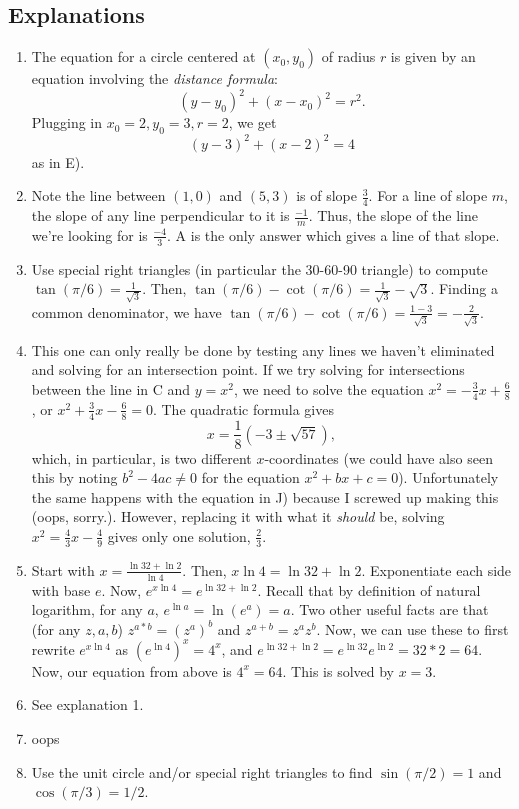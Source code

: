 \documentclass[english]{article}
\theoremstyle{remark}
\theoremstyle{definition}
\begin{document}
	\subsection*{Explanations}
	\begin{enumerate}
	\item The equation for a circle centered at $(x_0,y_0)$ of radius $r$ is given by an equation involving the \emph{distance formula}:$$(y-y_0)^2+(x-x_0)^2=r^2.$$ Plugging in $x_0=2,y_0=3,r=2$, we get $$(y-3)^2+(x-2)^2=4$$ as in E).
	\item Note the line between $(1,0)$ and $(5,3)$ is of slope $\frac{3}{4}$. For a line of slope $m$, the slope of any line perpendicular to it is $\frac{-1}{m}$. Thus, the slope of the line we're looking for is $\frac{-4}{3}$. A is the only answer which gives a line of that slope.
	\item Use special right triangles (in particular the 30-60-90 triangle) to compute $\tan(\pi/6)=\frac{1}{\sqrt{3}}$. Then, $\tan(\pi/6)-\cot(\pi/6)=\frac{1}{\sqrt{3}}-\sqrt{3}$. Finding a common denominator, we have $ \tan(\pi/6)-\cot(\pi/6)=\frac{1-3}{\sqrt{3}}=-\frac{2}{\sqrt{3}}$.\
\item This one can only really be done by testing any lines we haven't eliminated and solving for an intersection point. If we try solving for intersections between the line in C and $y=x^2$, we need to solve the equation $x^2=-\frac{3}{4}x+\frac{6}{8}$, or $x^2+\frac{3}{4}x-\frac{6}{8}=0$. The quadratic formula gives $$x=\frac{1}{8} \left(-3\pm\sqrt{57}\right),$$ which, in particular, is two different $x$-coordinates (we could have also seen this by noting $b^2-4ac\neq 0$ for the equation $x^2+bx+c=0$). Unfortunately the same happens with the equation in J) because I screwed up making this (oops, sorry.). However, replacing it with what it \textit{should} be, solving $x^2=\frac{4}{3}x-\frac{4}{9}$ gives only one solution, $\frac{2}{3}$. 
\item
Start with $x=\frac{\ln32+\ln2}{\ln4}$. Then, $x\ln4=\ln32+\ln2$. Exponentiate each side with base $e$. Now, $e^{x\ln 4}=e^{\ln32+\ln2}$. Recall that by definition of natural logarithm, for any $a$, $e^{\ln a}=\ln(e^a)=a$. Two other useful facts are that (for any $z,a,b$) $z^{a*b}=(z^a)^b$ and $z^{a+b}=z^az^b$. Now, we can use these to first rewrite $e^{x\ln4}$ as $(e^{\ln4})^x=4^x$, and $e^{\ln 32+\ln2}=e^{\ln 32}e^{\ln2}=32*2=64$. Now, our equation from above is $4^x=64$. This is solved by $x=3$.

\item See explanation 1.
\item oops
\item Use the unit circle and/or special right triangles to find $\sin(\pi/2)=1$ and $\cos(\pi/3)=1/2$.
	\end{enumerate}
	\newpage
\end{document}
